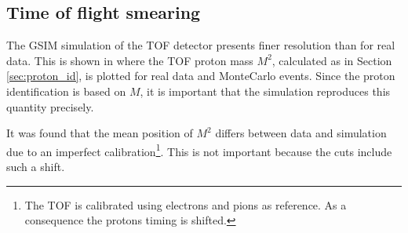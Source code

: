 \subsection{Time of flight smearing}
The GSIM simulation of the TOF detector 
presents finer resolution
than for real data.
This is shown in  where the TOF proton mass $M^2$, 
calculated as in Section \ref{sec:proton_id},
is plotted for real data and MonteCarlo events.
Since the proton identification is based on $M$, it is important that the simulation reproduces
this quantity precisely. 

It was found that the mean position of $M^2$ differs between data and simulation due to an imperfect
calibration\footnote{The TOF is calibrated using electrons and pions as reference.
                    As a consequence the protons timing is shifted. }.
This is not important because the cuts include such a shift.

